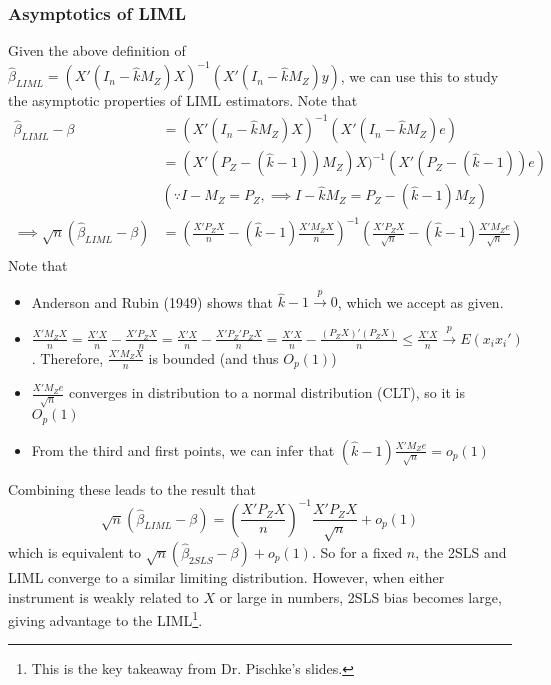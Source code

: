 \documentclass[12pt]{article}
\theoremstyle{definition}
\theoremstyle{property}
\theoremstyle{assumption}
\theoremstyle{example}
\theoremstyle{comment}
\begin{document}
\subsubsection{Asymptotics of LIML}
Given the above definition of $\hat{\beta}_{LIML}=(X'(I_n-\hat{k}M_Z)X)^{-1}(X'(I_n-\hat{k}M_Z)y)$, we can use this to study the asymptotic properties of LIML estimators. Note that
\[
\begin{aligned}
\hat{\beta}_{LIML}-\beta &= (X'(I_n-\hat{k}M_Z)X)^{-1}(X'(I_n-\hat{k}M_Z)e)\\
& =(X'(P_Z-(\hat{k}-1))M_Z)X)^{-1}(X'(P_Z-(\hat{k}-1))e) \\
& (\because I-M_Z=P_Z, \implies I-\hat{k}M_Z=P_Z-(\hat{k}-1)M_Z)\\
 \implies \sqrt{n}(\hat{\beta}_{LIML}-\beta)&=\left(\frac{X'P_ZX}{n}-(\hat{k}-1)\frac{X'M_ZX}{n}\right)^{-1}\left(\frac{X'P_ZX}{\sqrt{n}}-(\hat{k}-1)\frac{X'M_Ze}{\sqrt{n}}\right)\\
\end{aligned}
\]
Note that
\begin{itemize}
\item Anderson and Rubin (1949) shows that $\hat{k}-1\xrightarrow{p}0$, which we accept as given. 
\item $\frac{X'M_ZX}{n}=\frac{X'X}{n}-\frac{X'P_ZX}{n}=\frac{X'X}{n}-\frac{X'P_Z'P_ZX}{n}=\frac{X'X}{n}-\frac{(P_ZX)'(P_ZX)}{n}\leq\frac{X'X}{n}\xrightarrow{p}E(x_ix_i')$. Therefore, $\frac{X'M_ZX}{n}$ is bounded (and thus $O_p(1)$)
\item $\frac{X'M_Ze}{\sqrt{n}}$ converges in distribution to a normal distribution (CLT), so it is $O_p(1)$
\item From the third and first points, we can infer that $(\hat{k}-1)\frac{X'M_Ze}{\sqrt{n}}=o_p(1)$
\end{itemize}\par
Combining these leads to the result that 
\[
 \sqrt{n}(\hat{\beta}_{LIML}-\beta) =\left(\frac{X'P_ZX}{n}\right)^{-1}\frac{X'P_ZX}{\sqrt{n}} +o_p(1)
\]
which is equivalent to $ \sqrt{n}(\hat{\beta}_{2SLS}-\beta) +o_p(1)$. So for a fixed $n$, the 2SLS and LIML converge to a similar limiting distribution. However, when either instrument is weakly related to $X$ or large in numbers, 2SLS bias becomes large, giving advantage to the LIML\footnote{This is the key takeaway from Dr. Pischke's slides. }.
\end{document}
